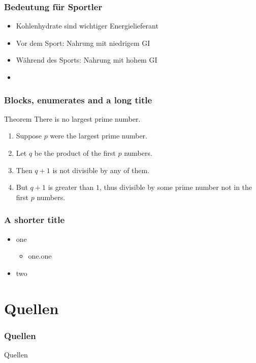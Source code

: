 \documentclass[ngerman, aspectratio=169]{beamer}
\begin{document}
\begin{frame}
  \frametitle{Bedeutung für Sportler}

  \begin{itemize}
  \item Kohlenhydrate sind wichtiger Energielieferant
  \item Vor dem Sport: Nahrung mit niedrigem GI
  \item Während des Sports: Nahrung mit hohem GI
  \item 
  \end{itemize}
  
\end{frame}


\begin{frame} 
  \frametitle{Blocks, enumerates and a long title} 
  \begin{block}{\centering Theorem}
    There is no largest prime number.
  \end{block} 

  \begin{enumerate} 
  \item<1-| alert@1> Suppose $p$ were the largest prime number. 
  \item<2-> Let $q$ be the product of the first $p$ numbers. 
  \item<3-> Then $q+1$ is not divisible by any of them. 
  \item<4-> But $q + 1$ is greater than $1$, thus divisible by some prime
    number not in the first $p$ numbers.
  \end{enumerate}
\end{frame}

\begin{frame}
  \frametitle{A shorter title}
  \begin{itemize}
  \item one
    \begin{itemize}
    \item one.one
    \end{itemize}
  \item two
  \end{itemize}
\end{frame}

\section{Quellen}
\begin{frame}
  \frametitle{Quellen}
  Quellen

\end{frame}
\end{document}
